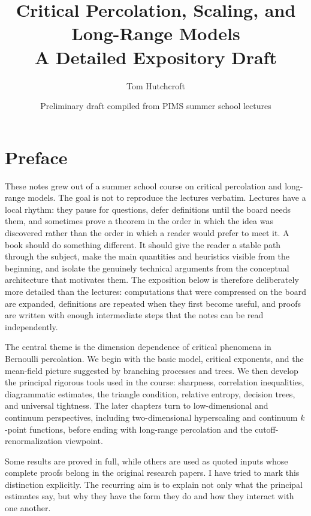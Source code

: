 \documentclass[11pt,reqno]{book}
\title{Critical Percolation, Scaling, and Long-Range Models\\A Detailed Expository Draft}
\author{Tom Hutchcroft}
\date{Preliminary draft compiled from PIMS summer school lectures}
\numberwithin{equation}{chapter}
\theoremstyle{plain}
\theoremstyle{definition}
\theoremstyle{remark}
\newcommand{\1}{\mathbf 1}
\begin{document}
\frontmatter
\maketitle

\chapter*{Preface}

These notes grew out of a summer school course on critical percolation and long-range models. The goal is not to reproduce the lectures verbatim. Lectures have a local rhythm: they pause for questions, defer definitions until the board needs them, and sometimes prove a theorem in the order in which the idea was discovered rather than the order in which a reader would prefer to meet it. A book should do something different. It should give the reader a stable path through the subject, make the main quantities and heuristics visible from the beginning, and isolate the genuinely technical arguments from the conceptual architecture that motivates them. The exposition below is therefore deliberately more detailed than the lectures: computations that were compressed on the board are expanded, definitions are repeated when they first become useful, and proofs are written with enough intermediate steps that the notes can be read independently.

The central theme is the dimension dependence of critical phenomena in Bernoulli percolation. We begin with the basic model, critical exponents, and the mean-field picture suggested by branching processes and trees. We then develop the principal rigorous tools used in the course: sharpness, correlation inequalities, diagrammatic estimates, the triangle condition, relative entropy, decision trees, and universal tightness. The later chapters turn to low-dimensional and continuum perspectives, including two-dimensional hyperscaling and continuum $k$-point functions, before ending with long-range percolation and the cutoff-renormalization viewpoint.

Some results are proved in full, while others are used as quoted inputs whose complete proofs belong in the original research papers. I have tried to mark this distinction explicitly. The recurring aim is to explain not only what the principal estimates say, but why they have the form they do and how they interact with one another.

\tableofcontents

\mainmatter
\end{document}
